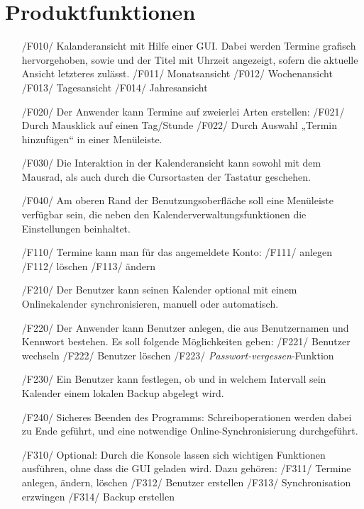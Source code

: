 \documentclass[a4paper]{article}
\begin{document}
  \section{Produktfunktionen}
    \begin{itemize}

			\item[/F010/] Kalanderansicht mit Hilfe einer GUI. Dabei werden Termine grafisch hervorgehoben, sowie und der Titel mit Uhrzeit angezeigt, sofern die aktuelle Ansicht letzteres zulässt.
				\subitem /F011/ Monatsansicht
				\subitem /F012/ Wochenansicht
				\subitem /F013/ Tagesansicht
				\subitem /F014/ Jahresansicht

			\item[/F020/] Der Anwender kann Termine auf zweierlei Arten erstellen:
				\subitem /F021/ Durch Mausklick auf einen Tag/Stunde
				\subitem /F022/ Durch Auswahl „Termin hinzufügen“ in einer Menüleiste.

			\item[/F030/] Die Interaktion in der Kalenderansicht kann sowohl mit dem Mausrad, als auch durch die Cursortasten der Tastatur geschehen.

			\item[/F040/] Am oberen Rand der Benutzungsoberfläche soll eine Menüleiste verfügbar sein, die neben den Kalenderverwaltungsfunktionen die Einstellungen beinhaltet.

			\item[/F110/] Termine kann man für das angemeldete Konto:
			  \subitem /F111/ anlegen
			  \subitem /F112/ löschen
			  \subitem /F113/ ändern

			\item[/F210/] Der Benutzer kann seinen Kalender optional mit einem Onlinekalender synchronisieren, manuell oder automatisch.
			\item[/F220/] Der Anwender kann Benutzer anlegen, die aus Benutzernamen und Kennwort bestehen. Es soll folgende Möglichkeiten geben:
				\subitem /F221/ Benutzer wechseln
				\subitem /F222/ Benutzer löschen
				\subitem /F223/ \textit{Passwort-vergessen}-Funktion
			\item[/F230/] Ein Benutzer kann festlegen, ob und in welchem Intervall sein Kalender einem lokalen Backup abgelegt wird.
			\item[/F240/] Sicheres Beenden des Programms: Schreiboperationen werden dabei zu Ende geführt, und eine notwendige Online-Synchronisierung durchgeführt.
		  \item[/F310/] Optional: Durch die Konsole lassen sich wichtigen Funktionen ausführen, ohne dass die GUI geladen wird. Dazu gehören:
				\subitem /F311/ Termine anlegen, ändern, löschen
			  \subitem /F312/ Benutzer erstellen
			  \subitem /F313/ Synchronisation erzwingen
			  \subitem /F314/ Backup erstellen
			\end{itemize}
\end{document}
